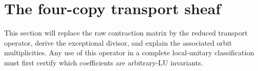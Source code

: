 \section{The four-copy transport sheaf}

This section will replace the raw contraction matrix by the reduced
transport operator, derive the exceptional divisor, and explain the
associated orbit multiplicities.  Any use of this operator in a complete
local-unitary classification must first certify which coefficients are
arbitrary-LU invariants.
